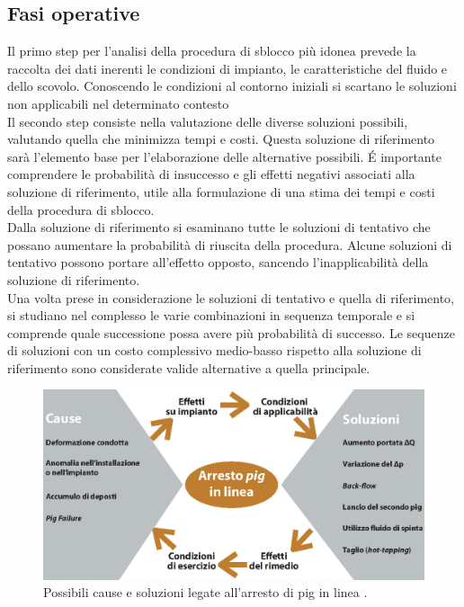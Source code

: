 \subsection{Fasi operative}
Il primo step per l'analisi della procedura di sblocco più idonea prevede la raccolta dei dati inerenti le condizioni di impianto, le caratteristiche del fluido e dello scovolo. Conoscendo le condizioni al contorno iniziali si scartano le soluzioni non applicabili nel determinato contesto\\
Il secondo step consiste nella valutazione delle diverse soluzioni possibili, valutando quella che minimizza tempi e costi. Questa soluzione di riferimento sarà l'elemento base per l'elaborazione delle alternative possibili. \'E importante comprendere le probabilità di insuccesso e gli effetti negativi associati alla soluzione di riferimento, utile alla formulazione di una stima dei tempi e costi della procedura di sblocco.\\
Dalla soluzione di riferimento si esaminano tutte le soluzioni di tentativo che possano aumentare la probabilità di riuscita della procedura. Alcune soluzioni di tentativo possono portare all'effetto opposto, sancendo l'inapplicabilità della soluzione di riferimento.\\
Una volta prese in considerazione le soluzioni di tentativo e quella di riferimento, si studiano nel complesso le varie combinazioni in sequenza temporale e si comprende quale successione possa avere più probabilità di successo. Le sequenze di soluzioni con un costo complessivo medio-basso rispetto alla soluzione di riferimento sono considerate valide alternative a quella principale.

\begin{figure}[htbp]
	\centering
	\includegraphics[width=\textwidth]{fig/pig/blocco.eps}
	\caption{Possibili cause e soluzioni legate all'arresto di pig in linea \parencite{diluvio2006questione}.}
	\label{fig:bloccopig}
\end{figure}

